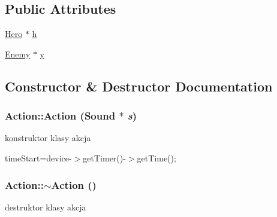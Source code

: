 \subsection*{Public Attributes}
\begin{DoxyCompactItemize}
\item 
\hyperlink{class_hero}{Hero} $\ast$ \hyperlink{class_action_aacf06ac0b16e0029a5cf496a49f6824b}{h}
\item 
\hyperlink{class_enemy}{Enemy} $\ast$ \hyperlink{class_action_a82c9b5b9178f7f2aa3ff8113143f8d6a}{y}
\end{DoxyCompactItemize}


\subsection{Constructor \& Destructor Documentation}
\hypertarget{class_action_a4ec61016a46dfe617d94ee67b0c1670c}{
\subsubsection[{Action}]{\setlength{\rightskip}{0pt plus 5cm}Action::Action ({\bf Sound} $\ast$ {\em s})}}
\label{class_action_a4ec61016a46dfe617d94ee67b0c1670c}
konstruktor klasy akcja 

timeStart=device-\/$>$getTimer()-\/$>$getTime(); \hypertarget{class_action_acdb06775d157339256a8ecd55749226c}{
\subsubsection[{$\sim$Action}]{\setlength{\rightskip}{0pt plus 5cm}Action::$\sim$Action ()}}
\label{class_action_acdb06775d157339256a8ecd55749226c}
destruktor klasy akcja 


